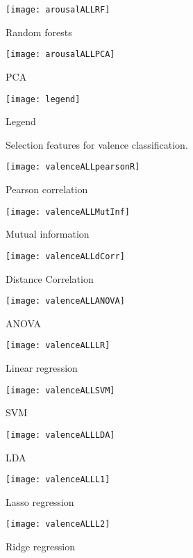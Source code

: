 \begin{figure}[!tbp]
  \begin{minipage}[b]{0.3\textwidth}
    \texttt{[image: arousalALLRF]}
    \caption{Random forests}
  \end{minipage}
  \hfill
  \begin{minipage}[b]{0.3\textwidth}
    \texttt{[image: arousalALLPCA]} %
    \caption{PCA}
  \end{minipage}
  \hfill
  \begin{minipage}[b]{0.3\textwidth}
    \texttt{[image: legend]}
    \caption{Legend\label{arousalpieslegend}}
  \end{minipage}
\end{figure}

\clearpage

\begin{figure}[!tbp]
  \centering
  \caption{Selection features for valence classification.\label{valencepies}}
  \begin{minipage}[b]{0.3\textwidth}
    \texttt{[image: valenceALLpearsonR]}
    \caption{Pearson correlation}
  \end{minipage}
  \hfill
  \begin{minipage}[b]{0.3\textwidth}
    \texttt{[image: valenceALLMutInf]}
    \caption{Mutual information}
  \end{minipage}
  \hfill
  \begin{minipage}[b]{0.3\textwidth}
    \texttt{[image: valenceALLdCorr]}
    \caption{Distance Correlation}
  \end{minipage}
  
  \begin{minipage}[b]{0.3\textwidth}
    \texttt{[image: valenceALLANOVA]}
    \caption{ANOVA}
  \end{minipage}
  \hfill
  \begin{minipage}[b]{0.3\textwidth}
    \texttt{[image: valenceALLLR]}
    \caption{Linear regression}
  \end{minipage}
  \hfill
  \begin{minipage}[b]{0.3\textwidth}
    \texttt{[image: valenceALLSVM]}
    \caption{SVM}
  \end{minipage}
  
  \begin{minipage}[b]{0.3\textwidth}
    \texttt{[image: valenceALLLDA]}
    \caption{LDA}
  \end{minipage}
  \hfill
  \begin{minipage}[b]{0.3\textwidth}
    \texttt{[image: valenceALLL1]}
    \caption{Lasso regression}
  \end{minipage}
  \hfill
  \begin{minipage}[b]{0.3\textwidth}
    \texttt{[image: valenceALLL2]}
    \caption{Ridge regression}
  \end{minipage}
  

\end{figure}

